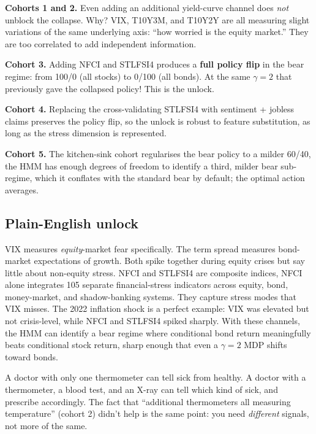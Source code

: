 \documentclass[11pt]{article}
\begin{document}
\textbf{Cohorts 1 and 2.} Even adding an additional yield-curve channel does \emph{not} unblock the collapse. Why? VIX, T10Y3M, and T10Y2Y are all measuring slight variations of the same underlying axis: ``how worried is the equity market.'' They are too correlated to add independent information.

\textbf{Cohort 3.} Adding NFCI and STLFSI4 produces a \textbf{full policy flip} in the bear regime: from 100/0 (all stocks) to 0/100 (all bonds). At the same $\gamma = 2$ that previously gave the collapsed policy! This is the unlock.

\textbf{Cohort 4.} Replacing the cross-validating STLFSI4 with sentiment + jobless claims preserves the policy flip, so the unlock is robust to feature substitution, as long as the stress dimension is represented.

\textbf{Cohort 5.} The kitchen-sink cohort regularises the bear policy to a milder 60/40, the HMM has enough degrees of freedom to identify a third, milder bear sub-regime, which it conflates with the standard bear by default; the optimal action averages.

\subsection{Plain-English unlock}

\begin{plainenglish}
VIX measures \emph{equity}-market fear specifically. The term spread measures bond-market expectations of growth. Both spike together during equity crises but say little about non-equity stress. NFCI and STLFSI4 are composite indices, NFCI alone integrates 105 separate financial-stress indicators across equity, bond, money-market, and shadow-banking systems. They capture stress modes that VIX misses. The 2022 inflation shock is a perfect example: VIX was elevated but not crisis-level, while NFCI and STLFSI4 spiked sharply. With these channels, the HMM can identify a bear regime where conditional bond return meaningfully beats conditional stock return, sharp enough that even a $\gamma = 2$ MDP shifts toward bonds.
\end{plainenglish}

\begin{analogy}
A doctor with only one thermometer can tell sick from healthy. A doctor with a thermometer, a blood test, and an X-ray can tell which kind of sick, and prescribe accordingly. The fact that ``additional thermometers all measuring temperature'' (cohort 2) didn't help is the same point: you need \emph{different} signals, not more of the same.
\end{analogy}
\end{document}
